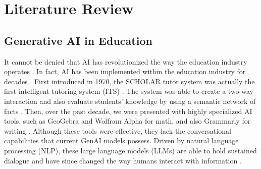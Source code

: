 \documentclass{article}
\begin{document}

\section{Literature Review}
\label{sec:literature-review}

\subsection{Generative AI in Education}
It cannot be denied that AI has revolutionized the way 
the education industry operates \cite{ma2025preparing}.
In fact, AI has been implemented within the education industry for decades \cite{Jabbour2025}.
First introduced in 1970, the SCHOLAR tutor system was actually the first 
intelligent tutoring system (ITS) \cite{Mousavinasab2021}. The system was able 
to create a two-way interaction and also evaluate students' knowledge 
by using a semantic network of facts \cite{Mousavinasab2021}. Then, over the 
past decade, we were presented with highly specialized AI tools, such as 
GeoGebra and Wolfram Alpha for math, and also Grammarly for writing \cite{Jabbour2025}. 
Although these tools were effective, they lack the conversational 
capabilities that current GenAI models possess. 
Driven by natural language processing (NLP), 
these large language models (LLMs) are able 
to hold sustained dialogue and have since 
changed the way humans interact with information \cite{Jabbour2025,sallai2024approach}.
\end{document}
